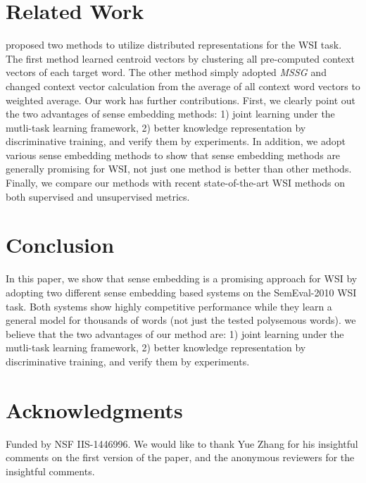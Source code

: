 \documentclass[11pt]{article}
\begin{document}
\section{Related Work}

 proposed two methods to utilize distributed representations for the WSI task.
The first method learned centroid vectors by clustering all pre-computed context vectors of each target word.
The other method simply adopted \emph{MSSG} \cite{neelakantan-EtAl:2014:EMNLP2014} and changed context vector calculation from the average of all context word vectors to weighted average.
Our work has further contributions. 
First, we clearly point out the two advantages of sense embedding methods: 
1) joint learning under the mutli-task learning framework, 
2) better knowledge representation by discriminative training, and 
verify them by experiments.
In addition, we adopt various sense embedding methods to show that sense embedding methods are generally promising for WSI, not just one method is better than other methods.
Finally, we compare our methods with recent state-of-the-art WSI methods on both supervised and unsupervised metrics.


\section{Conclusion}

In this paper, we show that sense embedding is a promising approach for WSI by adopting two different sense embedding based systems on the SemEval-2010 WSI task.
Both systems show highly competitive performance while they learn a general model for thousands of words (not just the tested polysemous words).
we believe that the two advantages of our method are:
1) joint learning under the mutli-task learning framework, 
2) better knowledge representation by discriminative training, and 
verify them by experiments.

\section*{Acknowledgments}

Funded by NSF IIS-1446996. We would like to thank Yue Zhang for his insightful comments on the first version of the paper, and the anonymous reviewers for the insightful comments.



\end{document}
